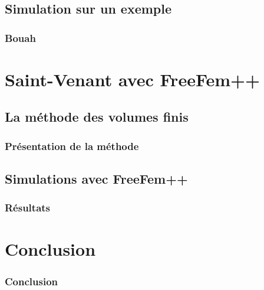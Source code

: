 \documentclass[handout]{beamer}
\begin{document}
\subsection[Simulation]{Simulation sur un exemple}
\begin{frame}
	\frametitle{Bouah}

\end{frame}

\section[FreeFem++]{Saint-Venant avec FreeFem++}
\subsection[Volumes finis]{La méthode des volumes finis}
\begin{frame}
	\frametitle{Présentation de la méthode}

\end{frame}

\subsection[Simulation FF++]{Simulations avec FreeFem++}
\begin{frame}
	\frametitle{Résultats}

\end{frame}

\section*{Conclusion}
\begin{frame}
	\frametitle{Conclusion}
\end{frame}
\end{document}
